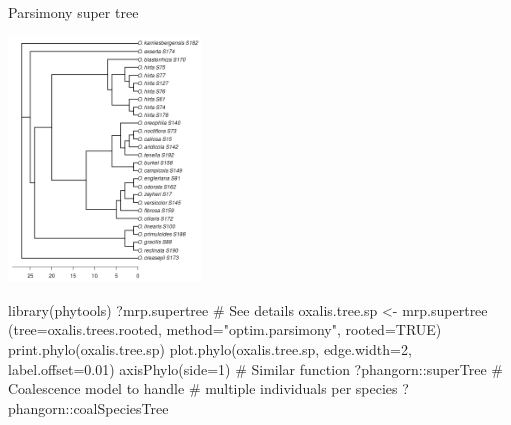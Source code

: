 \documentclass[compress, xelatex, 11pt, xcolor=svgnames, aspectratio=169,
	hyperref={
		bookmarks=true,
		unicode=true,
		colorlinks=true,
		pdftitle={Molecular data in R},
		plainpages=false,
		pdfauthor={Vojtech Zeisek},
		pdfsubject={Course about phylogeny and evolution in R},
		pdfcreator={XeLaTeX},
		pdfkeywords={R, evolution, phylogeny, molecular data},
		linkcolor=Crimson, %
		anchorcolor=Magenta, %
		citecolor=Magenta, %
		filecolor=Magenta, %
		menucolor=Magenta, %
		urlcolor=DodgerBlue, %
		},
	url={hyphens, lowtilde} %
	]{beamer}
\begin{document}
\begin{frame}[fragile]{Parsimony super tree}
	\begin{multicols}{2}
		\begin{center}
			\includegraphics[height=6.5cm]{oxalis-pars.png}
		\end{center}
		\begin{spluscode}
    library(phytools)
    ?mrp.supertree # See details
    oxalis.tree.sp <- mrp.supertree
      (tree=oxalis.trees.rooted,
      method="optim.parsimony",
      rooted=TRUE)
    print.phylo(oxalis.tree.sp)
    plot.phylo(oxalis.tree.sp,
      edge.width=2, label.offset=0.01)
    axisPhylo(side=1)
    # Similar function
    ?phangorn::superTree
    # Coalescence model to handle
    # multiple individuals per species
    ?phangorn::coalSpeciesTree
		\end{spluscode}
	\end{multicols}
\end{frame}

%
\end{document}
